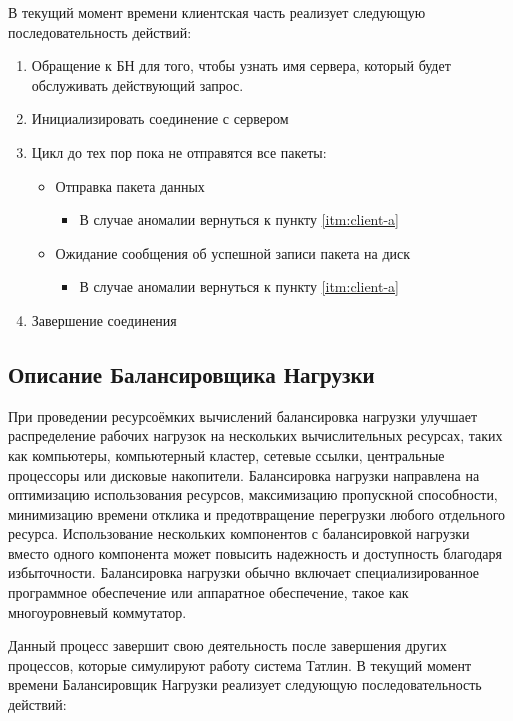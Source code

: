 \par 
В текущий момент времени клиентская часть реализует следующую последовательность действий:

\begin{enumerate}
\item\label{itm:client-a} Обращение к БН для того, чтобы узнать имя сервера, который будет обслуживать действующий запрос. 
\item Инициализировать соединение с сервером 

\item Цикл до тех пор пока не отправятся все пакеты:
	\begin{itemize}
		\item Отправка пакета данных 
			\begin{itemize}
				\item В случае аномалии вернуться к пункту \ref{itm:client-a}
			\end{itemize}
		\item Ожидание сообщения об успешной записи пакета на диск
			\begin{itemize}
				\item В случае аномалии вернуться к пункту \ref{itm:client-a}
			\end{itemize}
	\end{itemize}
\item Завершение соединения
\end{enumerate}



\subsection{Описание Балансировщика Нагрузки}
\par 
При проведении ресурсоёмких вычислений балансировка нагрузки улучшает распределение рабочих нагрузок на нескольких вычислительных ресурсах, таких как компьютеры, компьютерный кластер, сетевые ссылки, центральные процессоры или дисковые накопители. Балансировка нагрузки направлена на оптимизацию использования ресурсов, максимизацию пропускной способности, минимизацию времени отклика и предотвращение перегрузки любого отдельного ресурса. Использование нескольких компонентов с балансировкой нагрузки вместо одного компонента может повысить надежность и доступность благодаря избыточности. Балансировка нагрузки обычно включает специализированное программное обеспечение или аппаратное обеспечение, такое как многоуровневый коммутатор.
\par
Данный процесс завершит свою деятельность после завершения других процессов, которые симулируют работу система Татлин. В текущий момент времени Балансировщик Нагрузки реализует следующую последовательность действий: 

